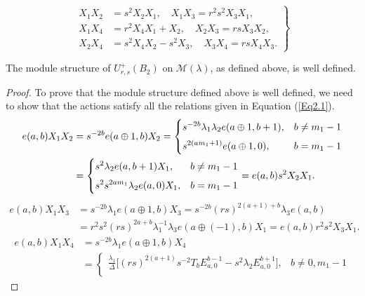 \documentclass[10pt,a4paper]{amsart}
\begin{document}
\begin{equation}\label{Eq2.1}
    \left.\begin{aligned}
    X_1 X_2 &= s^2 X_2 X_1,\quad X_1 X_3 = r^2 s^2 X_3 X_1,\\
X_1 X_4 &= r^2 X_4 X_1 + X_2, \quad X_2 X_3 = rs X_3 X_2, \\
    X_2 X_4 &= s^2 X_4 X_2 - s^2 X_3,\quad  X_3 X_4 = rs X_4 X_3.
\end{aligned}\right\}\end{equation}

\begin{thm}
    The module structure of $ U_{r,s}^+(B_2) $ on $ \mathcal{M}(\lambda) $, as defined above, is well defined.
\end{thm}

\begin{proof}
    To prove that the module structure defined above is well defined, we need to show that the actions satisfy all the relations given in Equation (\ref{Eq2.1}).
\begin{align*}e(a,b)X_1X_2&= s^{-2b}e(a\oplus1,b)X_2=\begin{cases}
        \displaystyle\displaystyle  s^{-2b}\lambda_1\lambda_2e(a\oplus1,b+1),&b\neq m_1-1\\[5pt]
        \displaystyle s^{2(am_1+1)}e(a\oplus1,0),&b= m_1-1
    \end{cases}\\
    &=\begin{cases} \displaystyle s^2\lambda_2e(a,b+1)X_1,& b\neq m_1-1\\[5pt]
     \displaystyle s^2s^{2am_1}\lambda_2e(a,0)X_1,&b=m_1-1
    \end{cases}=e(a,b)s^2X_2X_1.\end{align*}
    \begin{align*}
      e(a,b)X_1X_3&= s^{-2b} \lambda_1 e(a \oplus 1, b)X_3=s^{-2b}(rs)^{2(a+1)+b}\lambda_3e(a,b)\\
&=r^2s^2(rs)^{2a+b}\lambda_1^{-1}\lambda_3e(a\oplus(-1),b)X_1=e(a,b)r^2s^2X_3X_1.
    \end{align*}
\begin{align*}
      e(a,b)X_1X_4&=  s^{-2b} \lambda_1 e(a \oplus 1, b)X_4\\[5pt] &=\begin{cases}
        \displaystyle \frac{\lambda_1}{\Delta} \Bigg[ 
            (rs)^{2(a+1)} s^{-2} T_bE^{b-1}_{a,0}  - s^{2} \lambda_2 E^{b+1}_{a,0}  
        \Bigg], 
        &  b \neq 0, m_1 - 1 \\[15pt]

\end{cases}
\end{align*}
\end{proof}
\end{document}
